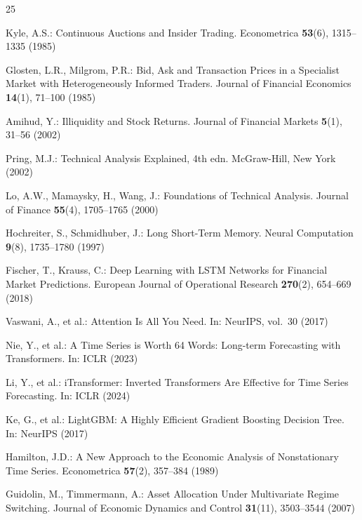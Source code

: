 \documentclass[runningheads]{llncs}
\begin{document}
\begin{thebibliography}{25}

Kyle, A.S.: Continuous Auctions and Insider Trading. Econometrica \textbf{53}(6), 1315--1335 (1985)

Glosten, L.R., Milgrom, P.R.: Bid, Ask and Transaction Prices in a Specialist Market with Heterogeneously Informed Traders. Journal of Financial Economics \textbf{14}(1), 71--100 (1985)

Amihud, Y.: Illiquidity and Stock Returns. Journal of Financial Markets \textbf{5}(1), 31--56 (2002)

Pring, M.J.: Technical Analysis Explained, 4th edn. McGraw-Hill, New York (2002)

Lo, A.W., Mamaysky, H., Wang, J.: Foundations of Technical Analysis. Journal of Finance \textbf{55}(4), 1705--1765 (2000)

Hochreiter, S., Schmidhuber, J.: Long Short-Term Memory. Neural Computation \textbf{9}(8), 1735--1780 (1997)

Fischer, T., Krauss, C.: Deep Learning with LSTM Networks for Financial Market Predictions. European Journal of Operational Research \textbf{270}(2), 654--669 (2018)

Vaswani, A., et al.: Attention Is All You Need. In: NeurIPS, vol.~30 (2017)

Nie, Y., et al.: A Time Series is Worth 64 Words: Long-term Forecasting with Transformers. In: ICLR (2023)

Li, Y., et al.: iTransformer: Inverted Transformers Are Effective for Time Series Forecasting. In: ICLR (2024)

Ke, G., et al.: LightGBM: A Highly Efficient Gradient Boosting Decision Tree. In: NeurIPS (2017)

Hamilton, J.D.: A New Approach to the Economic Analysis of Nonstationary Time Series. Econometrica \textbf{57}(2), 357--384 (1989)

Guidolin, M., Timmermann, A.: Asset Allocation Under Multivariate Regime Switching. Journal of Economic Dynamics and Control \textbf{31}(11), 3503--3544 (2007)


\end{thebibliography}
\end{document}
